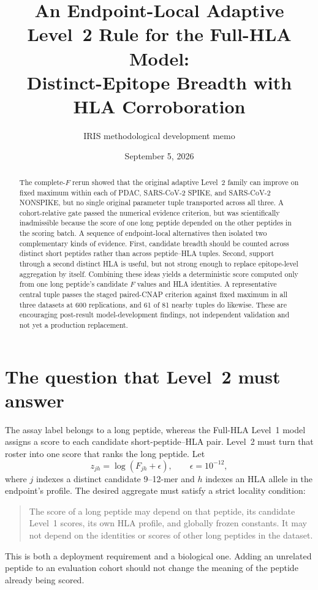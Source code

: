\documentclass[11pt]{article}
\title{\textbf{An Endpoint-Local Adaptive Level~2 Rule for the Full-HLA Model:\\Distinct-Epitope Breadth with HLA Corroboration}}
\author{IRIS methodological development memo}
\date{September 5, 2026}
\begin{document}
\maketitle

\begin{abstract}
The complete-$F$ rerun showed that the original adaptive Level~2 family can
improve on fixed maximum within each of PDAC, SARS-CoV-2 SPIKE, and
SARS-CoV-2 NONSPIKE, but no single original parameter tuple transported across
all three. A cohort-relative gate passed the numerical evidence criterion, but
was scientifically inadmissible because the score of one long peptide depended
on the other peptides in the scoring batch. A sequence of endpoint-local
alternatives then isolated two complementary kinds of evidence. First,
candidate breadth should be counted across distinct short peptides rather than
across peptide--HLA tuples. Second, support through a second distinct HLA is
useful, but not strong enough to replace epitope-level aggregation by itself.
Combining these ideas yields a deterministic score computed only from one long
peptide's candidate $F$ values and HLA identities. A representative central
tuple passes the staged paired-CNAP criterion against fixed maximum in all
three datasets at 600 replications, and 61 of 81 nearby tuples do likewise.
These are encouraging post-result model-development findings, not independent
validation and not yet a production replacement.
\end{abstract}

\section{The question that Level~2 must answer}

The assay label belongs to a long peptide, whereas the Full-HLA Level~1 model
assigns a score to each candidate short-peptide--HLA pair. Level~2 must turn
that roster into one score that ranks the long peptide. Let
\begin{equation}
z_{jh}=\log(F_{jh}+\epsilon), \qquad \epsilon=10^{-12},
\end{equation}
where $j$ indexes a distinct candidate 9--12-mer and $h$ indexes an HLA allele
in the endpoint's profile. The desired aggregate must satisfy a strict locality
condition:
\begin{quote}
The score of a long peptide may depend on that peptide, its candidate Level~1
scores, its own HLA profile, and globally frozen constants. It may not depend
on the identities or scores of other long peptides in the dataset.
\end{quote}
This is both a deployment requirement and a biological one. Adding an
unrelated peptide to an evaluation cohort should not change the meaning of the
peptide already being scored.
\end{document}
